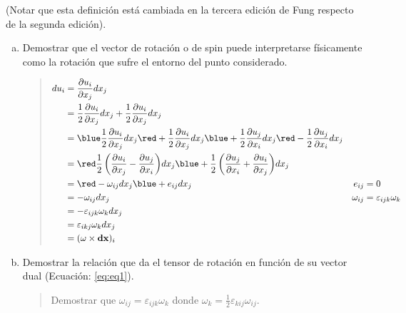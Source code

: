 \documentclass[a4paper,10pt,twoside,final,spanish]{article}
\begin{document}
(Notar que esta definición está cambiada en la tercera edición de Fung respecto de la 
segunda edición).

\begin{enumerate}[a.]
\item Demostrar que el vector de rotación o de spin puede interpretarse físicamente 
como la rotación que sufre el entorno del punto considerado.

\begin{quote}
\begin{align*}
du_{i} &= \frac{\partial u_{i}}{\partial x_{j}}dx_{j} & \\
&= \frac{1}{2}\frac{\partial u_{i}}{\partial x_{j}}dx_{j}
+\frac{1}{2}\frac{\partial u_{i}}{\partial x_{j}}dx_{j} & \\
&= {\blue \frac{1}{2}\frac{\partial u_{i}}{\partial x_{j}}dx_{j}}
{\red +\frac{1}{2}\frac{\partial u_{i}}{\partial x_{j}}dx_{j}}
{\blue +\frac{1}{2}\frac{\partial u_{j}}{\partial x_{i}}dx_{j}}
{\red -\frac{1}{2}\frac{\partial u_{j}}{\partial x_{i}}dx_{j}} & \\
&= {\red \frac{1}{2}\left(\frac{\partial u_{i}}{\partial x_{j}}
-\frac{\partial u_{j}}{\partial x_{i}}\right)}dx_{j}
{\blue +\frac{1}{2}\left(\frac{\partial u_{j}}{\partial x_{i}}
+\frac{\partial u_{i}}{\partial x_{j}}\right)}dx_{j} & \\
&= {\red -\omega_{ij}}dx_{j}{\blue +e_{ij}}dx_{j} & e_{ij} &= 0 \\
&= -\omega_{ij}dx_{j} & \omega_{ij} &= \varepsilon_{ijk}\omega_{k}\\
&= -\varepsilon_{ijk}\omega_{k}dx_{j} & \\
&= \varepsilon_{ikj}\omega_{k}dx_{j} & \\
&= (\mathbf{\omega}\times\mathbf{dx})_{i} & \\
\end{align*}
\end{quote}

\item Demostrar la relación que da el tensor de rotación en función de su vector dual 
(Ecuación: \ref{eq:eq1}).

\begin{quote}

Demostrar que $\omega_{ij}=\varepsilon_{ijk}\omega_{k}$ donde $\omega_{k}=\frac{1}{2}\varepsilon_{kij}\omega_{ij}$.


\end{quote}
\end{enumerate}
\end{document}
